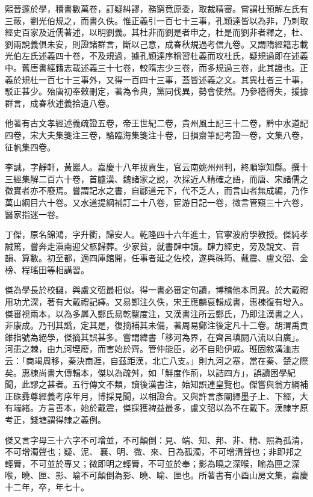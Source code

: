 \begin{pinyinscope}
熙晉邃於學，積書數萬卷，訂疑糾謬，務窮竟原委，取裁精審。嘗謂杜預解左氏有三蔽，劉光伯規之，而書久佚。惟正義引一百七十三事，孔穎達皆以為非，乃刺取經史百家及近儒著述，以明劉義。其杜非而劉是者申之，杜是而劉非者釋之，杜、劉兩說義俱未安，則證諸群言，斷以己意，成春秋規過考信九卷。又謂隋經籍志載光伯左氏述義四十卷，不及規過，據孔穎達序稱習杜義而攻杜氏，疑規過即在述義中。舊唐書經籍志載述義三十七卷，較隋志少三卷，而多規過三卷，此其證也。正義於規杜一百七十三事外，又得一百四十三事，蓋皆述義之文。其異杜者三十事，駁正甚少。殆唐初奉敕刪定，著為令典，黨同伐異，勢會使然。乃參稽得失，援據群言，成春秋述義拾遺八卷。

他著有古文孝經述義疏證五卷，帝王世紀二卷，貴州風土記三十二卷，黔中水道記四卷，宋大夫集箋注三卷，駱臨海集箋注十卷，日損齋筆記考證一卷，文集八卷，征帆集四卷。

李誠，字靜軒，黃巖人。嘉慶十八年拔貢生，官云南姚州州判，終順寧知縣。撰十三經集解二百六十卷，首臚漢、魏諸家之說，次採近人精確之語，而唐、宋諸儒之徵實者亦不廢焉。嘗謂記水之書，自酈道元下，代不乏人，而言山者無成編，乃作萬山綱目六十卷。又水道提綱補訂二十八卷，宦游日記一卷，微言管窺三十六卷，醫家指迷一卷。

丁傑，原名錦鴻，字升衢，歸安人。乾隆四十六年進士，官寧波府學教授。傑純孝誠篤，嘗奔走滇南迎父柩歸葬。少家貧，就書肆中讀。肆力經史，旁及說文、音韻、算數。初至都，適四庫館開，任事者延之佐校，遂與硃筠、戴震、盧文弨、金榜、程瑤田等相講習。

傑為學長於校讎，與盧文弨最相似。得一書必審定句讀，博稽他本同異。於大戴禮用功尤深，著有大戴禮記繹。又易鄭注久佚，宋王應麟裒輯成書，惠棟復有增入。傑審視兩本，以為多羼入鄭氏易乾鑿度注，又漢書注所云鄭氏，乃即注漢書之人，非康成。乃刊其譌，定其是，復摘補其未備，著周易鄭注後定凡十二卷。胡渭禹貢錐指號為絕學，傑摘其誤甚多。嘗謂緯書「移河為界，在齊呂填閼八流以自廣」。河患之棘，由九河堙廢，而害始於齊。管仲能臣，必不自貽伊戚。班固敘溝洫志云：「商竭周移，秦決南涯，自茲距漢，北亡八支。」則九河之塞，當在秦、楚之際矣。惠棟尚書大傳輯本，傑以為疏舛，如「鮮度作荊，以詰四方」，誤讀困學紀聞，此謬之甚者。五行傳文不類，讀後漢書注，始知誤連皇覽也。傑嘗與翁方綱補正硃彞尊經義考序年月，博採見聞，以相證合。又與許言彥闡繹墨子上、下經，大有端緒。方言善本，始於戴震，傑採獲裨益最多，盧文弨以為不在戴下。漢隸字原考正，錢塘謂得隸之義例。

傑又言字母三十六字不可增並，不可顛倒：見、端、知、邦、非、精、照為孤清，不可增濁聲也；疑、泥、襄、明、微、來、日為孤濁，不可增清聲也；非即邦之輕脣，不可並於專又；微即明之輕脣，不可並於奉；影為曉之深喉，喻為匣之深喉，曉、匣、影、喻不可顛倒為影、曉、喻、匣也。所著書有小酉山房文集，嘉慶十二年，卒，年七十。


\end{pinyinscope}
